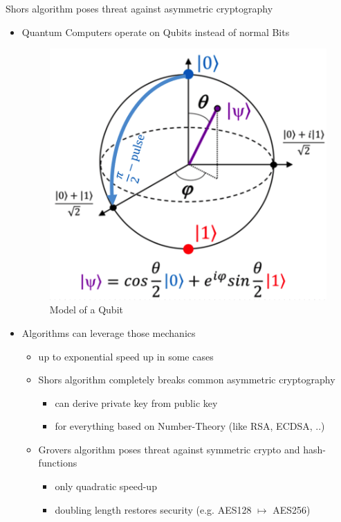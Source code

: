 \documentclass[ucs,10pt]{beamer}
\begin{document}
\begin{frame}{Shors algorithm poses threat against asymmetric cryptography}
  \begin{itemize}
  \item
    Quantum Computers operate on Qubits instead of normal Bits
  \begin{figure}[htbp]
    \centering
    \includegraphics[width=.2\textwidth]{../graphics/The-Bloch-sphere-provides-a-useful-means-of-visualizing-the-state-of-a-single-qubit-and.png}
    \caption{Model of a Qubit \cite{img:bloch}}
    \label{qubit}
  \end{figure}
  \item
    Algorithms can leverage those mechanics
    \begin{itemize}
      \item up to exponential speed up in some cases
      \item Shors algorithm completely breaks common asymmetric cryptography
      \begin{itemize}
        \item can derive private key from public key
        \item for everything based on Number-Theory (like RSA, ECDSA, ..)
      \end{itemize}
      \item  Grovers algorithm poses threat against symmetric crypto and hash-functions
      \begin{itemize}
        \item only quadratic speed-up
        \item doubling length restores security (e.g. AES128 $\mapsto$ AES256)
      \end{itemize}
    \end{itemize}
  \end{itemize}
\end{frame}
\end{document}
